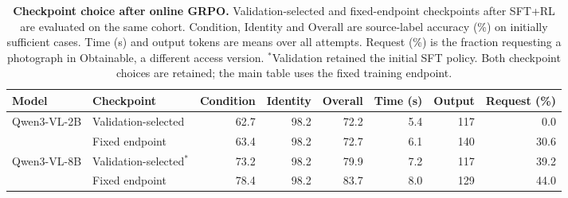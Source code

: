 \begin{table}[t]\centering\small\setlength{\tabcolsep}{4pt}
\begin{minipage}{.94\textwidth}\centering
\caption{\textbf{Checkpoint choice after online GRPO.}
Validation-selected and fixed-endpoint checkpoints after SFT+RL are evaluated on the same cohort.
Condition, Identity and Overall are source-label accuracy (\%) on initially sufficient cases.
Time (s) and output tokens are means over all attempts.
Request (\%) is the fraction requesting a photograph in Obtainable, a different access version.
$^{*}$Validation retained the initial SFT policy. Both checkpoint choices are retained; the main table uses the fixed training endpoint.}
\label{tab:rl-final}
\begin{tabular}{@{}llrrrrrr@{}}\toprule
Model & Checkpoint & Condition & Identity & Overall & Time (s) & Output & Request (\%)\\\midrule
Qwen3-VL-2B & Validation-selected & 62.7 & 98.2 & 72.2 & 5.4 & 117 & 0.0\\
 & Fixed endpoint & 63.4 & 98.2 & 72.7 & 6.1 & 140 & 30.6\\
\midrule
Qwen3-VL-8B & Validation-selected$^{*}$ & 73.2 & 98.2 & 79.9 & 7.2 & 117 & 39.2\\
 & Fixed endpoint & 78.4 & 98.2 & 83.7 & 8.0 & 129 & 44.0\\
\bottomrule
\end{tabular}\end{minipage}\end{table}
